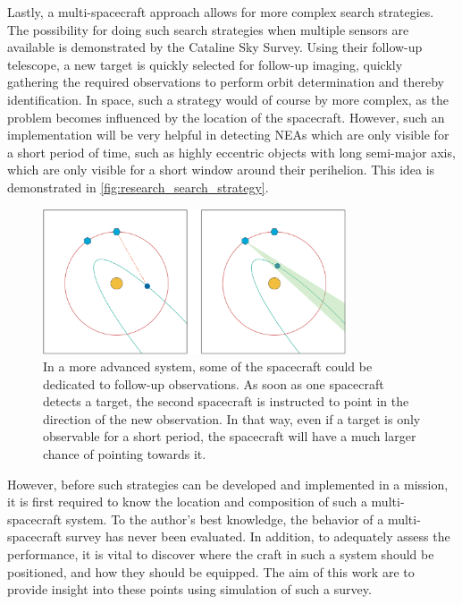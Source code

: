 Lastly, a multi-spacecraft approach allows for more complex search strategies. The possibility for doing such search strategies when multiple sensors are available is demonstrated by the Cataline Sky Survey. Using their follow-up telescope, a new target is quickly selected for follow-up imaging, quickly gathering the required observations to perform orbit determination and thereby identification. In space, such a strategy would of course by more complex, as the problem becomes influenced by the location of the spacecraft. However, such an implementation will be very helpful in detecting NEAs which are only visible for a short period of time, such as highly eccentric objects with long semi-major axis, which are only visible for a short window around their perihelion. This idea is demonstrated in \autoref{fig:research_search_strategy}.\\

\begin{figure}[htbp]
 \centering
 \includegraphics[width=0.8\textwidth]{img/research_search_strategy.png}
 \caption{In a more advanced system, some of the spacecraft could be dedicated to follow-up observations. As soon as one spacecraft detects a target, the second spacecraft is instructed to point in the direction of the new observation. In that way, even if a target is only observable for a short period, the spacecraft will have a much larger chance of pointing towards it.}
 \label{fig:research_search_strategy}
\end{figure}


However, before such strategies can be developed and implemented in a mission, it is first required to know the location and composition of such a multi-spacecraft system. To the author's best knowledge, the behavior of a multi-spacecraft survey has never been evaluated. In addition, to adequately assess the performance, it is vital to discover where the craft in such a system should be positioned, and how they should be equipped. The aim of this work are to provide insight into these points using simulation of such a survey.

